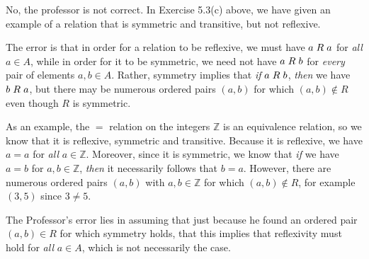 \documentclass[a4paper,12pt]{article}
\begin{document}
No, the professor is not correct. In Exercise 5.3(c) above, we have given an example of a relation that is symmetric and transitive, but not reflexive. 

The error is that in order for a relation to be reflexive, we must have $a \hspace{1mm} R \hspace{1mm} a$ for \textit{all} $a \in A$, while in order for it to be symmetric, we need not have $a \hspace{1mm} R \hspace{1mm} b$ for \textit{every} pair of elements $a, b \in A$. Rather, symmetry implies that \textit{if} $a \hspace{1mm} R \hspace{1mm} b$, \textit{then} we have $b \hspace{1mm} R \hspace{1mm} a$, but there may be numerous ordered pairs $(a,b)$ for which $(a,b) \not\in R$ even though $R$ is symmetric.

As an example, the $=$ relation on the integers $\mathbb{Z}$ is an equivalence relation, so we know that it is reflexive, symmetric and transitive. Because it is reflexive, we have $a=a$ for \textit{all} $a \in \mathbb{Z}$. Moreover, since it is symmetric, we know that \textit{if} we have $a = b$ for $a, b \in \mathbb{Z}$, \textit{then} it necessarily follows that $b=a$. However, there are numerous ordered pairs $(a,b)$ with $a,b \in \mathbb{Z}$ for which $(a,b) \not\in R$, for example $(3,5)$ since $3 \not= 5$.

The Professor's error lies in assuming that just because he found an ordered pair $(a,b) \in R$ for which symmetry holds, that this implies that reflexivity must hold for \textit{all} $a \in A$, which is not necessarily the case. 
\end{document}
